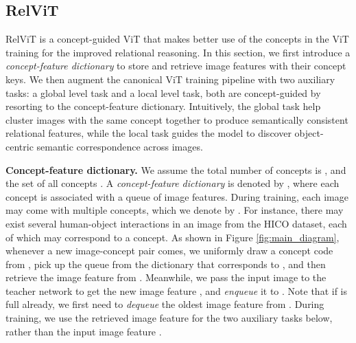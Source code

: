 \documentclass{article} \usepackage{iclr2022_conference,times}
\renewcommand{\paragraph}[1]{\noindent\textbf{#1.}}
\newcommand{\relvit}{RelViT }
\begin{document}
\vspace{-0.14in}
\subsection{RelViT}
 \vskip-0.1in
\label{sec:relvit}
\relvit is a concept-guided ViT that makes better use of the concepts in the ViT training for the improved relational reasoning. In this section, we first introduce a \emph{concept-feature dictionary} to store and retrieve image features with their concept keys. We then augment the canonical ViT training pipeline with two auxiliary tasks: a global level task and a local level task, both are concept-guided by resorting to the concept-feature dictionary. Intuitively, the global task help cluster images with the same concept together to produce semantically consistent relational features, while the local task guides the model to discover object-centric semantic correspondence across images. 


\paragraph{Concept-feature dictionary}
We assume the total number of concepts is , and the set of all concepts . A \textit{concept-feature dictionary} is denoted by , where each concept  is associated with a queue  of image features. 
During training, each image  may come with multiple concepts, which we denote by . For instance, there may exist several human-object interactions in an image from the HICO dataset, each of which may correspond to a concept. 
As shown in Figure \ref{fig:main_diagram}, whenever a new image-concept pair  comes, we uniformly draw a concept code  from , pick up the queue  from the dictionary that corresponds to , and then retrieve the image feature  from .
Meanwhile, we pass the input image  to the teacher network  to get the new image feature , and \emph{enqueue} it to . Note that if  is full already, we first need to \emph{dequeue} the oldest image feature from . During training, we use the retrieved image feature  for the two auxiliary tasks below, rather than the input image feature .
\end{document}
